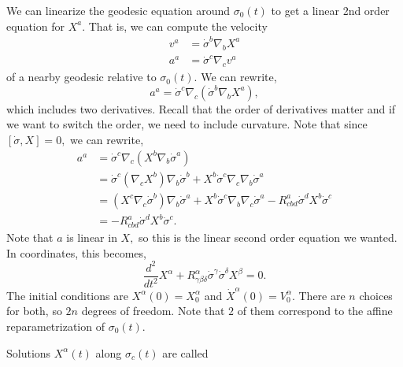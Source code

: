 \documentclass{article}
\numberwithin{equation}{section}
\begin{document}
We can linearize the geodesic equation around $\sigma_0(t)$ to get a linear 2nd order equation for $X^a.$ That is, we can compute the velocity
\begin{align*}
    v^a &= \dot{\sigma}^b\nabla_bX^a \\ 
    a^a &= \dot{\sigma}^c\nabla_c v^a
\end{align*}
of a nearby geodesic relative to $\sigma_0(t).$ We can rewrite,
\begin{equation*}
    a^a = \dot{\sigma}^c\nabla_c\left(\dot{\sigma}^b\nabla_bX^a\right),
\end{equation*}
which includes two derivatives. Recall that the order of derivatives matter and if we want to switch the order, we need to include curvature. Note that since $[\dot{\sigma},X] = 0,$ we can rewrite,
\begin{align*}
    a^a &= \dot{\sigma}^c\nabla_c\left(X^b\nabla_b\dot{\sigma}^a\right) \\ 
    &= \dot{\sigma}^c(\nabla_cX^b)\nabla_b\dot{\sigma}^b + X^b\dot{\sigma}^c\nabla_c\nabla_b \dot{\sigma}^a \\ 
    &= (X^c\nabla_c\dot{\sigma}^b)\nabla_b\dot{\sigma}^a + X^b\dot{\sigma}^c\nabla_b\nabla_c\dot{\sigma}^a - R_{cbd}^a\dot{\sigma}^dX^b\dot{\sigma}^c \\ 
    &= -R_{cbd}^a\dot{\sigma}^dX^b\dot{\sigma}^c.
\end{align*}
Note that $a$ is linear in $X,$ so this is the linear second order equation we wanted. In coordinates, this becomes,
\begin{equation*}
    \frac{d^2}{dt^2}X^\alpha + R_{\gamma\beta\delta}^{\alpha}\dot{\sigma}^\gamma \dot{\sigma}^{\delta}X^\beta = 0.
\end{equation*}
The initial conditions are $X^\alpha(0) = X_0^\alpha$ and $\dot{X}^\alpha(0) = V_0^\alpha.$ There are $n$ choices for both, so $2n$ degrees of freedom. Note that $2$ of them correspond to the affine reparametrization of $\sigma_0(t).$ 

Solutions $X^\alpha(t)$ along $\sigma_c(t)$ are called 
\end{document}
